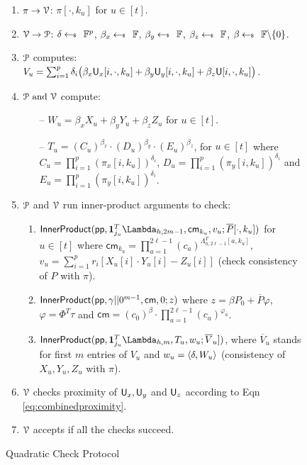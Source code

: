 \begin{figure}[h!]
{\begin{framed}
\begin{enumerate}[{\rm 1.}]
				\item $\pi\rightarrow\verifier$: $\pi[\cdot,k_u]$ for $u\in [t]$.
				\item $\verifier\rightarrow\prover$: $\delta \sample \FF^p$, $\beta_x\sample \FF$, $\beta_y\sample \FF$, $\beta_z\sample \FF$, $\beta \sample \FF \backslash \{0\}$.
				\item $\prover$ computes: $V_u=\sum_{i=1}^p\delta_i\big(\beta_x\ewit_x[i,\cdot,k_u]+\beta_y\ewit_y[i,\cdot,k_u]+\beta_z\ewit[i,\cdot,k_u]\big)$.
				\item $\prover \text{ and }\verifier$ compute:
				\begin{itemize}
					\item[--] $W_u=\beta_xX_u+\beta_yY_u+\beta_zZ_u$ for $u\in [t]$.
					\item[--] $T_u=(C_u)^{\beta_x}\cdot(D_u)^{\beta_y}\cdot(E_u)^{\beta_z}$, for $u\in [t]$ where $C_u=\prod_{i=1}^{p}(\pi_x[i,k_u])^{\delta_i}$, $D_u=\prod_{i=1}^{p}(\pi_y[i,k_u])^{\delta_i}$ and $E_u=\prod_{i=1}^{p}(\pi_y[i,k_u])^{\delta_i}$.
				\end{itemize}
				\item $\prover$ and $\verifier$ run inner-product arguments to check:
				\begin{enumerate}
					\item $\innerproduct(\mathsf{pp},\bm{1}_{j_u}^T\Lambda_{h,2m-1},\mathsf{cm}_{k_u},v_u;\overline{P}[\cdot,k_u])$ for $u\in [t]$ where $\mathsf{cm}_{k_u}=\prod_{a=1}^{2\ell-1}(c_a)^{\Lambda_{n,2\ell-1}^T[a,k_u]}$, $v_u=\sum_{i=1}^p r_i[X_u[i]\cdot Y_u[i] - Z_u[i]]$ (check consistency of $P$ with $\pi$).
					\item $\innerproduct(\mathsf{pp},\gamma||0^{m-1},\mathsf{cm},0;z)$ where $z=\beta P_0 +\overline{P}\varphi$, $\varphi = \Phi^T\tau$ and	$\mathsf{cm} =  (c_0)^{\beta}\cdot\prod_{a=1}^{2\ell-1} (c_a)^{\varphi_a}$.
					\item $\innerproduct(\mathsf{pp},\bm{1}_{j_u}^T\Lambda_{h,m},T_u,w_u;\overline{V}_u])$, where $\overline{V}_u$ stands for first $m$ entries of $V_u$ and $w_u = \innp{\delta}{W_u}$ (consistency of $X_u, Y_u, Z_u$ with $\pi$). 
				\end{enumerate}
				\item $\verifier$ checks proximity of $\ewit_x,\ewit_y$	and $\ewit_z$ according to Eqn \eqref{eq:combinedproximity}.
				\item $\verifier$ accepts if all the checks succeed.
			\end{enumerate}
		\end{framed}
		\caption{Quadratic Check Protocol}
		\label{fig:quadcheck}
	}
\end{figure}

